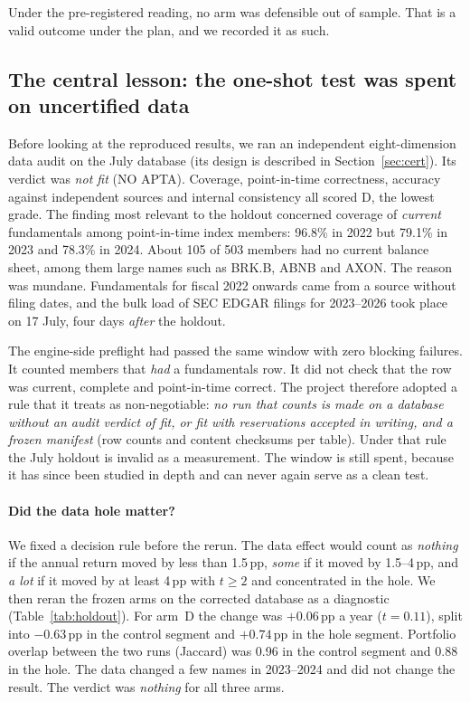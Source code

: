 \documentclass[11pt]{article}
\begin{document}
Under the pre-registered reading, no arm was defensible out of sample. That is a valid outcome under the plan, and we recorded it as such.

\subsection{The central lesson: the one-shot test was spent on uncertified data}

Before looking at the reproduced results, we ran an independent eight-dimension data audit on the July database (its design is described in Section~\ref{sec:cert}). Its verdict was \emph{not fit} (NO APTA). Coverage, point-in-time correctness, accuracy against independent sources and internal consistency all scored D, the lowest grade. The finding most relevant to the holdout concerned coverage of \emph{current} fundamentals among point-in-time index members: 96.8\% in 2022 but 79.1\% in 2023 and 78.3\% in 2024. About 105 of 503 members had no current balance sheet, among them large names such as BRK.B, ABNB and AXON. The reason was mundane. Fundamentals for fiscal 2022 onwards came from a source without filing dates, and the bulk load of SEC EDGAR filings for 2023--2026 took place on 17 July, four days \emph{after} the holdout.

The engine-side preflight had passed the same window with zero blocking failures. It counted members that \emph{had} a fundamentals row. It did not check that the row was current, complete and point-in-time correct. The project therefore adopted a rule that it treats as non-negotiable: \emph{no run that counts is made on a database without an audit verdict of fit, or fit with reservations accepted in writing, and a frozen manifest} (row counts and content checksums per table). Under that rule the July holdout is invalid as a measurement. The window is still spent, because it has since been studied in depth and can never again serve as a clean test.

\paragraph{Did the data hole matter?} We fixed a decision rule before the rerun. The data effect would count as \emph{nothing} if the annual return moved by less than 1.5\,pp, \emph{some} if it moved by 1.5--4\,pp, and \emph{a lot} if it moved by at least 4\,pp with $t\ge 2$ and concentrated in the hole. We then reran the frozen arms on the corrected database as a diagnostic (Table~\ref{tab:holdout}). For arm~D the change was $+0.06$\,pp a year ($t=0.11$), split into $-0.63$\,pp in the control segment and $+0.74$\,pp in the hole segment. Portfolio overlap between the two runs (Jaccard) was 0.96 in the control segment and 0.88 in the hole. The data changed a few names in 2023--2024 and did not change the result. The verdict was \emph{nothing} for all three arms.
\end{document}
